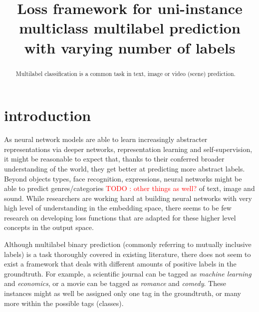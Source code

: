 \documentclass[sigconf,natbib,screen=true,review=true,anonymous]{acmart}
\newcommand\todo[1]{\textcolor{red}{TODO : #1}}
\begin{document}
\title{Loss framework for uni-instance multiclass multilabel prediction with varying number of labels}







\begin{abstract}
Multilabel classification is a common task in text, image or video (scene) prediction.
\end{abstract}



\maketitle

\acresetall

\section{introduction}
\label{sec:org13fbded}

As neural network models are able to learn increasingly abstracter representations via deeper networks, representation learning and self-supervision, it might be reasonable to expect that, thanks to their conferred broader understanding of the world, they get better at predicting more abstract labels. Beyond objects types, face recognition, expressions, neural networks might be able to predict genres/categories \todo{other things as well?} of text, image and sound. While researchers are working hard at building neural networks with very high level of understanding in the embedding space, there seems to be few research on developing loss functions that are adapted for these higher level concepts in the output space.

Although multilabel binary prediction (commonly referring to mutually inclusive labels) is a task thoroughly covered in existing literature, there does not seem to exist a framework that deals with different amounts of positive labels in the groundtruth. For example, a scientific journal can be tagged as \emph{machine learning} and \emph{economics}, or a movie can be tagged as \emph{romance} and \emph{comedy}. These instances might as well be assigned only one tag in the groundtruth, or many more within the possible tags (classes).
\end{document}
